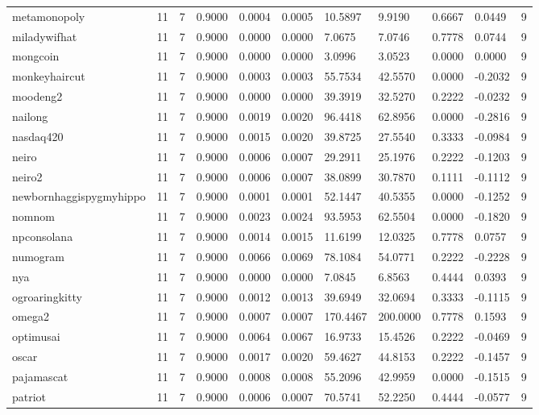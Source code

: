 \begin{table}[htbp]
\begin{tabular}{lllllllllll}
metamonopoly & 11 & 7 & 0.9000 & 0.0004 & 0.0005 & 10.5897 & 9.9190 & 0.6667 & 0.0449 & 9 \\
miladywifhat & 11 & 7 & 0.9000 & 0.0000 & 0.0000 & 7.0675 & 7.0746 & 0.7778 & 0.0744 & 9 \\
mongcoin & 11 & 7 & 0.9000 & 0.0000 & 0.0000 & 3.0996 & 3.0523 & 0.0000 & 0.0000 & 9 \\
monkeyhaircut & 11 & 7 & 0.9000 & 0.0003 & 0.0003 & 55.7534 & 42.5570 & 0.0000 & -0.2032 & 9 \\
moodeng2 & 11 & 7 & 0.9000 & 0.0000 & 0.0000 & 39.3919 & 32.5270 & 0.2222 & -0.0232 & 9 \\
nailong & 11 & 7 & 0.9000 & 0.0019 & 0.0020 & 96.4418 & 62.8956 & 0.0000 & -0.2816 & 9 \\
nasdaq420 & 11 & 7 & 0.9000 & 0.0015 & 0.0020 & 39.8725 & 27.5540 & 0.3333 & -0.0984 & 9 \\
neiro & 11 & 7 & 0.9000 & 0.0006 & 0.0007 & 29.2911 & 25.1976 & 0.2222 & -0.1203 & 9 \\
neiro2 & 11 & 7 & 0.9000 & 0.0006 & 0.0007 & 38.0899 & 30.7870 & 0.1111 & -0.1112 & 9 \\
newbornhaggispygmyhippo & 11 & 7 & 0.9000 & 0.0001 & 0.0001 & 52.1447 & 40.5355 & 0.0000 & -0.1252 & 9 \\
nomnom & 11 & 7 & 0.9000 & 0.0023 & 0.0024 & 93.5953 & 62.5504 & 0.0000 & -0.1820 & 9 \\
npconsolana & 11 & 7 & 0.9000 & 0.0014 & 0.0015 & 11.6199 & 12.0325 & 0.7778 & 0.0757 & 9 \\
numogram & 11 & 7 & 0.9000 & 0.0066 & 0.0069 & 78.1084 & 54.0771 & 0.2222 & -0.2228 & 9 \\
nya & 11 & 7 & 0.9000 & 0.0000 & 0.0000 & 7.0845 & 6.8563 & 0.4444 & 0.0393 & 9 \\
ogroaringkitty & 11 & 7 & 0.9000 & 0.0012 & 0.0013 & 39.6949 & 32.0694 & 0.3333 & -0.1115 & 9 \\
omega2 & 11 & 7 & 0.9000 & 0.0007 & 0.0007 & 170.4467 & 200.0000 & 0.7778 & 0.1593 & 9 \\
optimusai & 11 & 7 & 0.9000 & 0.0064 & 0.0067 & 16.9733 & 15.4526 & 0.2222 & -0.0469 & 9 \\
oscar & 11 & 7 & 0.9000 & 0.0017 & 0.0020 & 59.4627 & 44.8153 & 0.2222 & -0.1457 & 9 \\
pajamascat & 11 & 7 & 0.9000 & 0.0008 & 0.0008 & 55.2096 & 42.9959 & 0.0000 & -0.1515 & 9 \\
patriot & 11 & 7 & 0.9000 & 0.0006 & 0.0007 & 70.5741 & 52.2250 & 0.4444 & -0.0577 & 9 \\

\end{tabular}
\end{table}
